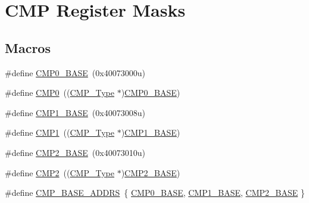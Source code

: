 \hypertarget{group___c_m_p___register___masks}{}\section{C\+MP Register Masks}
\label{group___c_m_p___register___masks}
\subsection*{Macros}
\begin{DoxyCompactItemize}
\item 
\#define \mbox{\hyperlink{group___c_m_p___register___masks_gaa174cde56b35e3d6a74b2a752296c268}{C\+M\+P0\+\_\+\+B\+A\+SE}}~(0x40073000u)
\item 
\#define \mbox{\hyperlink{group___c_m_p___register___masks_ga2cf98276319113bb5d9ece4d7d7ed09d}{C\+M\+P0}}~((\mbox{\hyperlink{struct_c_m_p___type}{C\+M\+P\+\_\+\+Type}} $\ast$)\mbox{\hyperlink{group___c_m_p___register___masks_gaa174cde56b35e3d6a74b2a752296c268}{C\+M\+P0\+\_\+\+B\+A\+SE}})
\item 
\#define \mbox{\hyperlink{group___c_m_p___register___masks_ga890dc341ab8c2c9f71f9840cda07b9cb}{C\+M\+P1\+\_\+\+B\+A\+SE}}~(0x40073008u)
\item 
\#define \mbox{\hyperlink{group___c_m_p___register___masks_ga4feda05828d32e7b657d871ccf105538}{C\+M\+P1}}~((\mbox{\hyperlink{struct_c_m_p___type}{C\+M\+P\+\_\+\+Type}} $\ast$)\mbox{\hyperlink{group___c_m_p___register___masks_ga890dc341ab8c2c9f71f9840cda07b9cb}{C\+M\+P1\+\_\+\+B\+A\+SE}})
\item 
\#define \mbox{\hyperlink{group___c_m_p___register___masks_ga7e986bf6335f75207120a0ee5b84d1c6}{C\+M\+P2\+\_\+\+B\+A\+SE}}~(0x40073010u)
\item 
\#define \mbox{\hyperlink{group___c_m_p___register___masks_ga023ff9e161b651f7f47e0457fe0c1fcb}{C\+M\+P2}}~((\mbox{\hyperlink{struct_c_m_p___type}{C\+M\+P\+\_\+\+Type}} $\ast$)\mbox{\hyperlink{group___c_m_p___register___masks_ga7e986bf6335f75207120a0ee5b84d1c6}{C\+M\+P2\+\_\+\+B\+A\+SE}})
\item 
\#define \mbox{\hyperlink{group___c_m_p___register___masks_gad9f05fa33dbe017e0dd089dab69067d7}{C\+M\+P\+\_\+\+B\+A\+S\+E\+\_\+\+A\+D\+D\+RS}}~\{ \mbox{\hyperlink{group___c_m_p___register___masks_gaa174cde56b35e3d6a74b2a752296c268}{C\+M\+P0\+\_\+\+B\+A\+SE}}, \mbox{\hyperlink{group___c_m_p___register___masks_ga890dc341ab8c2c9f71f9840cda07b9cb}{C\+M\+P1\+\_\+\+B\+A\+SE}}, \mbox{\hyperlink{group___c_m_p___register___masks_ga7e986bf6335f75207120a0ee5b84d1c6}{C\+M\+P2\+\_\+\+B\+A\+SE}} \}

\end{DoxyCompactItemize}
